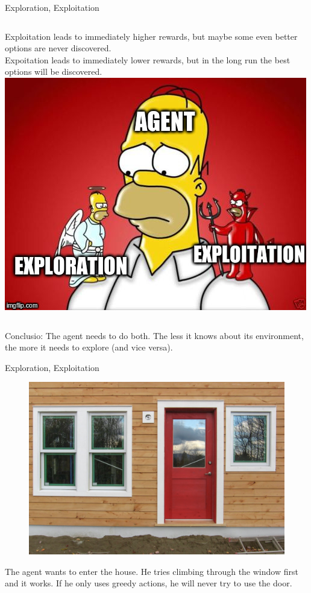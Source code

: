 \documentclass{beamer}
\begin{document}
\begin{frame}{Exploration, Exploitation}
	\begin{columns}
	Exploitation leads to immediately higher rewards, but maybe some even better options are never discovered. \\[\baselineskip]
	Expoitation leads to immediately lower rewards, but in the long run the best options will be discovered. \\[\baselineskip]
	\includegraphics[width=\linewidth]{Images/exploration.jpg} \\[\baselineskip]
	\end{columns} 
	\vspace{1cm}
	Conclusio: The agent needs to do both. The less it knows about its environment, the more it needs to explore (and vice versa).
\end{frame}


\begin{frame}{Exploration, Exploitation}
	\begin{figure}
	\centering
	\includegraphics[width=0.6\linewidth]{Images/window.png}\\
	\end{figure}
	The agent wants to enter the house. He tries climbing through the window first and it works. If he only uses greedy actions, he will never try to use the door.
\end{frame}
\end{document}
